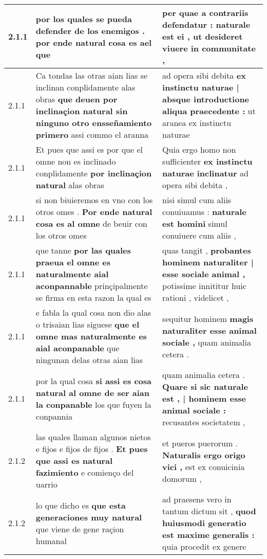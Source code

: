 \begin{tabular}{|p{1cm}|p{6.5cm}|p{6.5cm}|}
2.1.1 & por los quales se pueda defender de los enemigos . \textbf{ por ende natural cosa es ael } que & per quae a contrariis defendatur : \textbf{ naturale est ei , } ut desideret viuere in communitate , \\\hline
2.1.1 & Ca tondas las otras aian lias se inclinan conplidamente alas obras \textbf{ que deuen por inclinaçion natural sin ninguno otro ensseñamiento primero } assi commo el aranna & ad opera sibi debita \textbf{ ex instinctu naturae | absque introductione aliqua praecedente : } ut aranea ex instinctu naturae \\\hline
2.1.1 & Et pues que assi es por que el omne non es inclinado conplidamente \textbf{ por inclinaçion natural } alas obras & Quia ergo homo non sufficienter \textbf{ ex instinctu naturae inclinatur } ad opera sibi debita , \\\hline
2.1.1 & si non biuieremos en vno con los otros omes . \textbf{ Por ende natural cosa es al omne } de beuir con los otros omes & nisi simul cum aliis conuiuamus : \textbf{ naturale est homini } simul conuiuere cum aliis , \\\hline
2.1.1 & que tanne \textbf{ por las quales praeua el omne es naturalmente aial aconpannable } prinçipalmente se firma en esta razon la qual es & quas tangit , \textbf{ probantes hominem naturaliter | esse sociale animal , } potissime innititur huic rationi , videlicet , \\\hline
2.1.1 & e fabla la qual cosa non dio alas o trisaian lias siguese \textbf{ que el omne mas naturalmente es aial aconpanable } que ningunan delas otras aian lias & sequitur hominem \textbf{ magis naturaliter esse animal sociale , } quam animalia cetera . \\\hline
2.1.1 & por la qual cosa \textbf{ si assi es cosa natural al omne de ser aian la conpanable } los que fuyen la conpannia & quam animalia cetera . \textbf{ Quare si sic naturale est , | hominem esse animal sociale : } recusantes societatem , \\\hline
2.1.2 & las quales llaman algunos nietos e fijos e fijos de fijos . \textbf{ Et pues que assi es natural fazimiento } e comienço del uarrio & et pueros puerorum . \textbf{ Naturalis ergo origo vici , } est ex conuicinia domorum , \\\hline
2.1.2 & lo que dicho es \textbf{ que esta generaciones muy natural } que viene de gene raçion humanal & ad praesens vero in tantum dictum sit , \textbf{ quod huiusmodi generatio est maxime generalis : } quia procedit ex genere \\\hline

\end{tabular}
